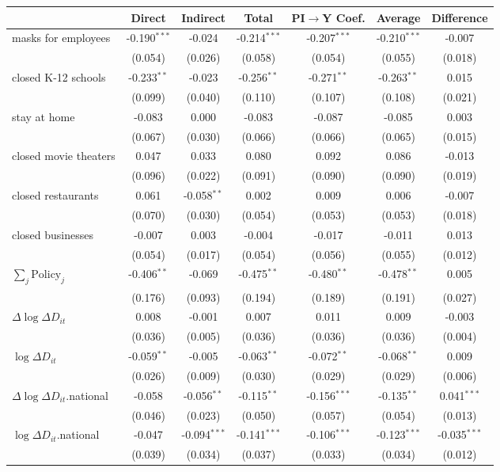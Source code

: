 
\begin{tabular}{lccccc|>{}c}
\toprule
  & Direct & Indirect & Total & PI$\to$Y Coef. & Average & Difference\\
\midrule
masks for employees & -0.190$^{***}$ & -0.024 & -0.214$^{***}$ & -0.207$^{***}$ & -0.210$^{***}$ & -0.007\\
 & (0.054) & (0.026) & (0.058) & (0.054) & (0.055) & (0.018)\\
closed K-12 schools & -0.233$^{**}$ & -0.023 & -0.256$^{**}$ & -0.271$^{**}$ & -0.263$^{**}$ & 0.015\\
 & (0.099) & (0.040) & (0.110) & (0.107) & (0.108) & (0.021)\\
stay at home & -0.083 & 0.000 & -0.083 & -0.087 & -0.085 & 0.003\\
 & (0.067) & (0.030) & (0.066) & (0.066) & (0.065) & (0.015)\\
closed movie theaters & 0.047 & 0.033 & 0.080 & 0.092 & 0.086 & -0.013\\
 & (0.096) & (0.022) & (0.091) & (0.090) & (0.090) & (0.019)\\
closed restaurants & 0.061 & -0.058$^{**}$ & 0.002 & 0.009 & 0.006 & -0.007\\
 & (0.070) & (0.030) & (0.054) & (0.053) & (0.053) & (0.018)\\
closed businesses & -0.007 & 0.003 & -0.004 & -0.017 & -0.011 & 0.013\\
 & (0.054) & (0.017) & (0.054) & (0.056) & (0.055) & (0.012)\\
$\sum_j \mathrm{Policy}_j$ & -0.406$^{**}$ & -0.069 & -0.475$^{**}$ & -0.480$^{**}$ & -0.478$^{**}$ & 0.005\\
 & (0.176) & (0.093) & (0.194) & (0.189) & (0.191) & (0.027)\\
$\Delta \log \Delta D_{it}$ & 0.008 & -0.001 & 0.007 & 0.011 & 0.009 & -0.003\\
 & (0.036) & (0.005) & (0.036) & (0.036) & (0.036) & (0.004)\\
$\log \Delta D_{it}$ & -0.059$^{**}$ & -0.005 & -0.063$^{**}$ & -0.072$^{**}$ & -0.068$^{**}$ & 0.009\\
 & (0.026) & (0.009) & (0.030) & (0.029) & (0.029) & (0.006)\\
$\Delta \log \Delta D_{it}$.national & -0.058 & -0.056$^{**}$ & -0.115$^{**}$ & -0.156$^{***}$ & -0.135$^{**}$ & 0.041$^{***}$\\
 & (0.046) & (0.023) & (0.050) & (0.057) & (0.054) & (0.013)\\
$\log \Delta D_{it}$.national & -0.047 & -0.094$^{***}$ & -0.141$^{***}$ & -0.106$^{***}$ & -0.123$^{***}$ & -0.035$^{***}$\\
 & (0.039) & (0.034) & (0.037) & (0.033) & (0.034) & (0.012)\\
\bottomrule
\end{tabular}